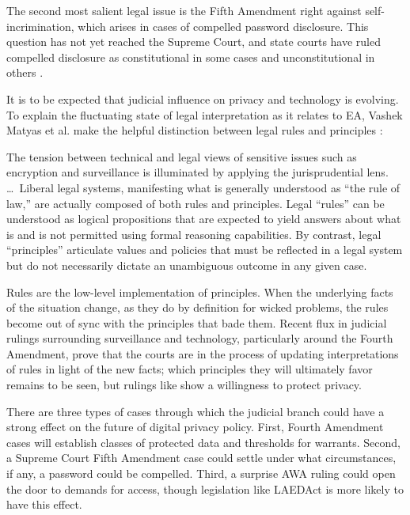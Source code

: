 The second most salient legal issue is the Fifth Amendment right against self-incrimination, which arises in cases of
compelled password disclosure. This question has not yet reached the Supreme Court, and state courts have ruled
compelled disclosure as constitutional in some cases \cite{sobel_2019} \cite{lee_nj_2020} and unconstitutional in others
\cite{lee_its_2020} \cite{vaas_2019}.

It is to be expected that judicial influence on privacy and technology is evolving. To explain the fluctuating state of
legal interpretation as it relates to \ac{EA}, Vashek Matyas et al. make the helpful distinction between legal rules and
principles \cite{matyas_incommensurability_2018}:

\begin{displayquote}
The tension between technical and legal views of sensitive issues such as encryption and surveillance is illuminated by
applying the jurisprudential lens. \dots~Liberal legal systems, manifesting what is generally understood as ``the rule
of law,'' are actually composed of both rules and principles. Legal ``rules'' can be understood as logical propositions
that are expected to yield answers about what is and is not permitted using formal reasoning capabilities. By contrast,
legal ``principles'' articulate values and policies that must be reflected in a legal system but do not necessarily
dictate an unambiguous outcome in any given case.
\end{displayquote}

Rules are the low-level implementation of principles. When the underlying facts of the situation change, as they do by
definition for wicked problems, the rules become out of sync with the principles that bade them. Recent flux in judicial
rulings surrounding surveillance and technology, particularly around the Fourth Amendment, prove that the courts are in
the process of updating interpretations of rules in light of the new facts; which principles they will ultimately favor
remains to be seen, but rulings like  show a willingness to protect privacy.

There are three types of cases through which the judicial branch could have a strong effect on the future of digital
privacy policy. First, Fourth Amendment cases will establish classes of protected data and thresholds for warrants.
Second, a Supreme Court Fifth Amendment case could settle under what circumstances, if any, a password could be
compelled. Third, a surprise \ac{AWA} ruling could open the door to demands for access, though legislation like
\ac{LAEDAct} is more likely to have this effect.



